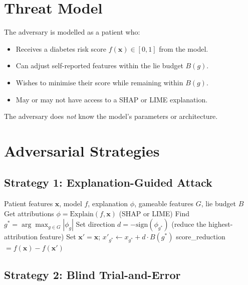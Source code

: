 \documentclass[12pt, a4paper, oneside]{report}
\theoremstyle{definition}
\begin{document}
\section{Threat Model}

The adversary is modelled as a patient who:
\begin{itemize}
  \item Receives a diabetes risk score $f(\mathbf{x}) \in [0,1]$ from the model.
  \item Can adjust self-reported features within the lie budget $B(g)$.
  \item Wishes to minimise their score while remaining within $B(g)$.
  \item May or may not have access to a SHAP or LIME explanation.
\end{itemize}

The adversary does \textit{not} know the model's parameters or architecture.

\section{Adversarial Strategies}

\subsection{Strategy 1: Explanation-Guided Attack}

\begin{algorithm}
  \caption{Explanation-Guided Attack}
  \label{alg:explanation}
  \begin{algorithmic}[1]
    \Require Patient features $\mathbf{x}$, model $f$, explanation $\phi$,
             gameable features $G$, lie budget $B$
    \State Get attributions $\phi = \mathrm{Explain}(f, \mathbf{x})$
           (SHAP or LIME)
    \State Find $g^* = \arg\max_{g \in G} |\phi_g|$
    \State Set direction $d = -\mathrm{sign}(\phi_{g^*})$
           (reduce the highest-attribution feature)
    \State Set $\mathbf{x}' = \mathbf{x}$; $x'_{g^*} \leftarrow x_{g^*} + d \cdot B(g^*)$
    \State \Return score\_reduction $= f(\mathbf{x}) - f(\mathbf{x}')$
  \end{algorithmic}
\end{algorithm}

\subsection{Strategy 2: Blind Trial-and-Error}
\end{document}
